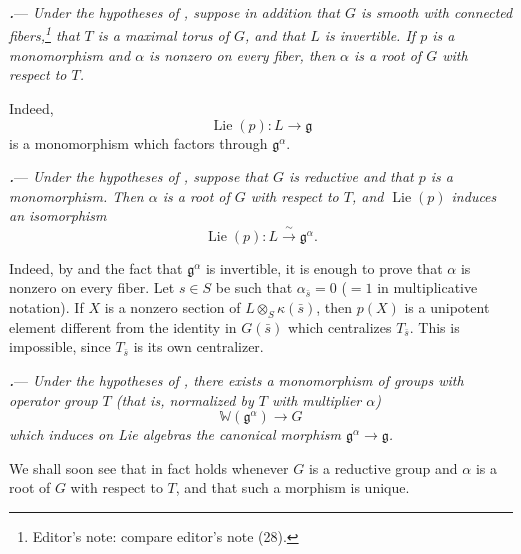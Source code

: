 \par\medskip\noindent
{}\textbf{\textit{.}}---
\textit{Under the hypotheses of , suppose in addition that \(G\)
is smooth with connected fibers,\footnote{Editor's note: compare
editor's note \textup{(28)}.} that \(T\) is a maximal torus of \(G\),
and that \(L\) is invertible.  If \(p\) is a monomorphism and
\(\alpha\) is nonzero on every fiber, then \(\alpha\) is a root of
\(G\) with respect to \(T\).}

Indeed,
\[
  \operatorname{Lie}(p)\colon L\longrightarrow\mathfrak g
\]
is a monomorphism which factors through \(\mathfrak g^\alpha\).

\par\medskip\noindent
{}\textbf{\textit{.}}---
\textit{Under the hypotheses of , suppose that \(G\) is reductive
and that \(p\) is a monomorphism.  Then \(\alpha\) is a root of \(G\)
with respect to \(T\), and \(\operatorname{Lie}(p)\) induces an
isomorphism}
\[
  \operatorname{Lie}(p)\colon
  L\xrightarrow{\ \sim\ }\mathfrak g^\alpha.
\]

Indeed, by  and the fact that \(\mathfrak g^\alpha\) is
invertible, it is enough to prove that \(\alpha\) is nonzero on every
fiber.  Let \(s\in S\) be such that
\(\alpha_{\bar s}=0\) \textup{(\(=1\) in multiplicative notation)}.
If \(X\) is a nonzero section of
\(L\otimes_S\kappa(\bar s)\), then \(p(X)\) is a unipotent element
different from the identity in \(G(\bar s)\) which centralizes
\(T_{\bar s}\).  This is impossible, since \(T_{\bar s}\) is its own
centralizer.

\par\medskip\noindent
{}\textbf{\textit{.}}---
\textit{Under the hypotheses of , there exists a monomorphism of
groups with operator group \(T\) \textup{(that is, normalized by
\(T\) with multiplier \(\alpha\))}
\[
  \mathbb W(\mathfrak g^\alpha)\longrightarrow G
\]
which induces on Lie algebras the canonical morphism
\(\mathfrak g^\alpha\to\mathfrak g\).}

We shall soon see that  in fact holds whenever \(G\) is a
reductive group and \(\alpha\) is a root of \(G\) with respect to
\(T\), and that such a morphism is unique.



